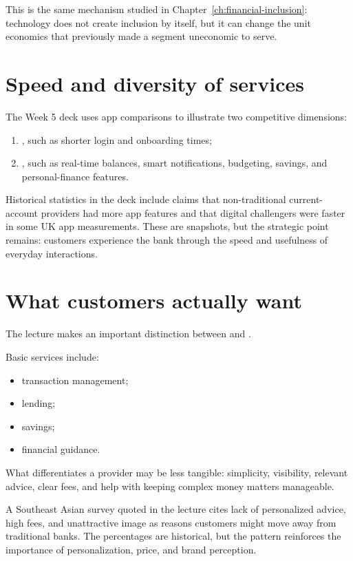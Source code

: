 This is the same mechanism studied in Chapter~\ref{ch:financial-inclusion}: technology does not create inclusion by itself, but it can change the unit economics that previously made a segment uneconomic to serve.

\section{Speed and diversity of services}

The Week 5 deck uses app comparisons to illustrate two competitive dimensions:

\begin{enumerate}
  \item {}, such as shorter login and onboarding times;
  \item {}, such as real-time balances, smart notifications, budgeting, savings, and personal-finance features.
\end{enumerate}

Historical statistics in the deck include claims that non-traditional current-account providers had more app features and that digital challengers were faster in some UK app measurements. These are snapshots, but the strategic point remains: customers experience the bank through the speed and usefulness of everyday interactions.

\section{What customers actually want}

The lecture makes an important distinction between  and .

Basic services include:

\begin{itemize}
  \item transaction management;
  \item lending;
  \item savings;
  \item financial guidance.
\end{itemize}

What differentiates a provider may be less tangible: simplicity, visibility, relevant advice, clear fees, and help with keeping complex money matters manageable.

A Southeast Asian survey quoted in the lecture cites lack of personalized advice, high fees, and unattractive image as reasons customers might move away from traditional banks. The percentages are historical, but the pattern reinforces the importance of personalization, price, and brand perception.

